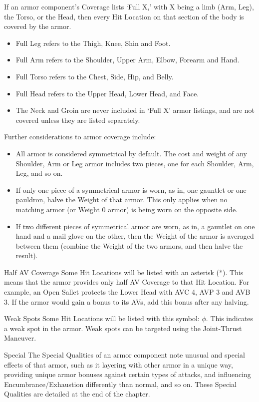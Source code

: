 \documentclass[oneside,11pt,english]{book}
\begin{document}
 

If an armor component’s Coverage lists ‘Full X,’ with X being a limb (Arm, Leg), the Torso, or the Head, 
then every Hit Location on that section of the body is covered by the armor. 
\begin{itemize}
\item Full Leg refers to the Thigh, Knee, Shin and Foot. 
\item Full Arm refers to the Shoulder, Upper Arm, Elbow, Forearm and Hand. 
\item Full Torso refers to the Chest, Side, Hip, and Belly. 
\item Full Head refers to the Upper Head, Lower Head, and Face. 
\item The Neck and Groin are never included in ‘Full X’ armor listings, and are not covered unless they 
are listed separately. 
\end{itemize}
 

Further considerations to armor coverage include: 
\begin{itemize}
\item All armor is considered symmetrical by default. The cost and weight of any Shoulder, Arm or 
Leg armor includes two pieces, one for each Shoulder, Arm, Leg, and so on. 
\item If only one piece of a symmetrical armor is worn, as in, one gauntlet or one pauldron, halve the 
Weight of that armor. This only applies when no matching armor (or Weight 0 armor) is being 
worn on the opposite side. 
\item If two different pieces of symmetrical armor are worn, as in, a gauntlet on one hand and a 
mail glove on the other, then the Weight of the armor is averaged between them (combine the 
Weight of the two armors, and then halve the result). 
\end{itemize}
 

Half AV Coverage 
Some Hit Locations will be listed with an asterisk (*). This means that the armor provides only half AV 
Coverage to that Hit Location. For example, an Open Sallet protects the Lower Head with AVC 4, AVP 3 
and AVB 3. If the armor would gain a bonus to its AVs, add this bonus after any halving. 

 

Weak Spots 
Some Hit Locations will be listed with this symbol: $\phi$. This indicates a weak spot in the armor. Weak 
spots can be targeted using the Joint-Thrust Maneuver. 

 

Special 
The Special Qualities of an armor component note unusual and special effects of that armor, such as it 
layering with other armor in a unique way, providing unique armor bonuses against certain types of 
attacks, and influencing Encumbrance/Exhaustion differently than normal, and so on. These Special 
Qualities are detailed at the end of the chapter. 
\end{document}
